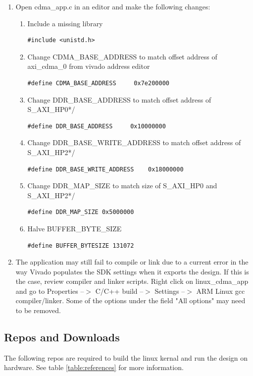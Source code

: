 \documentclass[12pt]{article}
\begin{document}
\begin{enumerate}
\item Open cdma\_app.c in an editor and make the following changes:
\begin{enumerate}
\item Include a missing library 
\begin{lstlisting}
#include <unistd.h>
\end{lstlisting}
\item Change CDMA\_BASE\_ADDRESS to match offset address of axi\_cdma\_0 from vivado address editor 
\begin{lstlisting}
#define CDMA_BASE_ADDRESS     0x7e200000 
\end{lstlisting}
\item Change DDR\_BASE\_ADDRESS to match offset address of S\_AXI\_HP0*/
\begin{lstlisting}
#define DDR_BASE_ADDRESS     0x10000000
\end{lstlisting}
\item Change DDR\_BASE\_WRITE\_ADDRESS to match offset address of S\_AXI\_HP2*/
\begin{lstlisting}
#define DDR_BASE_WRITE_ADDRESS    0x18000000
\end{lstlisting}
\item Change DDR\_MAP\_SIZE to match size of S\_AXI\_HP0 and S\_AXI\_HP2*/
\begin{lstlisting}
#define DDR_MAP_SIZE 0x5000000
\end{lstlisting}
\item Halve BUFFER\_BYTE\_SIZE
\begin{lstlisting}
#define BUFFER_BYTESIZE	131072		
\end{lstlisting}

\end{enumerate}
\item The application may still fail to compile or link due to a current error in the way Vivado populates the SDK settings when it exports the design.  If this is the case, review compiler and linker scripts.  Right click on linux\_cdma\_app and go to Properties --$>$ C/C++ build --$>$ Settings --$>$ ARM Linux gcc compiler/linker.  Some of the options under the field "All options" may need to be removed.
\end{enumerate}
\subsection{Repos and Downloads}\label{subsec:repos}The following repos are required to build the linux kernal and run the design on hardware.  See table \ref{table:references} for more information.  
\\
\end{document}
